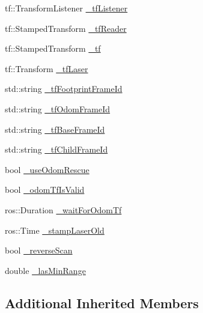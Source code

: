 \begin{DoxyCompactItemize}
\item 
tf\-::\-Transform\-Listener \hyperlink{classohm__tsd__slam__ref_1_1ThreadLocalize_a224fab0e74f4e79a3bd7477c7ba67927}{\-\_\-tf\-Listener}
\item 
tf\-::\-Stamped\-Transform \hyperlink{classohm__tsd__slam__ref_1_1ThreadLocalize_ad6eb4ec2cbb72976a751195aaa87b230}{\-\_\-tf\-Reader}
\item 
tf\-::\-Stamped\-Transform \hyperlink{classohm__tsd__slam__ref_1_1ThreadLocalize_a58c3e63ca51b4f667361138ca9612a43}{\-\_\-tf}
\item 
tf\-::\-Transform \hyperlink{classohm__tsd__slam__ref_1_1ThreadLocalize_a865325fdc2badfde0512622d52d60f46}{\-\_\-tf\-Laser}
\item 
std\-::string \hyperlink{classohm__tsd__slam__ref_1_1ThreadLocalize_a49f36ec368f39a906125435adb7fa231}{\-\_\-tf\-Footprint\-Frame\-Id}
\item 
std\-::string \hyperlink{classohm__tsd__slam__ref_1_1ThreadLocalize_a4f3c79f1893a406885983bd8984954e2}{\-\_\-tf\-Odom\-Frame\-Id}
\item 
std\-::string \hyperlink{classohm__tsd__slam__ref_1_1ThreadLocalize_ab83a495abfe38788855cd283334052ee}{\-\_\-tf\-Base\-Frame\-Id}
\item 
std\-::string \hyperlink{classohm__tsd__slam__ref_1_1ThreadLocalize_a15312866770a11e59f0e2e260a5d8c05}{\-\_\-tf\-Child\-Frame\-Id}
\item 
bool \hyperlink{classohm__tsd__slam__ref_1_1ThreadLocalize_a50a25580c50a3b14d04a548416142d6c}{\-\_\-use\-Odom\-Rescue}
\item 
bool \hyperlink{classohm__tsd__slam__ref_1_1ThreadLocalize_a60894678d5815e42124c78eef219cf8b}{\-\_\-odom\-Tf\-Is\-Valid}
\item 
ros\-::\-Duration \hyperlink{classohm__tsd__slam__ref_1_1ThreadLocalize_a5f43425ab2bb540e72205ef83e37d4ff}{\-\_\-wait\-For\-Odom\-Tf}
\item 
ros\-::\-Time \hyperlink{classohm__tsd__slam__ref_1_1ThreadLocalize_a3993fb6424dd9af667ddf0b14cdf2fe4}{\-\_\-stamp\-Laser\-Old}
\item 
bool \hyperlink{classohm__tsd__slam__ref_1_1ThreadLocalize_a176899f67fbf706a756853a8af968fd5}{\-\_\-reverse\-Scan}
\item 
double \hyperlink{classohm__tsd__slam__ref_1_1ThreadLocalize_a6170ca0dd6108536689c4dab3f7425f6}{\-\_\-las\-Min\-Range}
\end{DoxyCompactItemize}
\subsection*{Additional Inherited Members}



